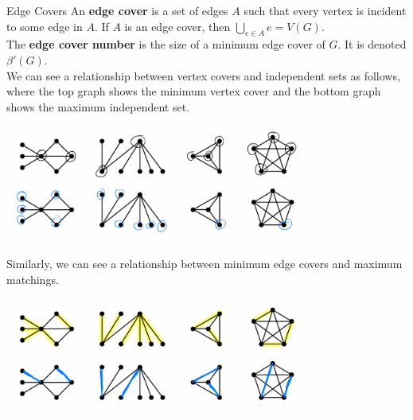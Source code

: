 \documentclass[10pt]{extarticle}
\begin{document}
  \begin{problem}{Edge Covers}
    An \textbf{edge cover} is a set of edges $A$ such that every vertex is incident to some edge in $A$. If $A$ is an edge cover, then $\bigcup_{e\in A} e = V(G)$.\\

    The \textbf{edge cover number} is the size of a minimum edge cover of $G$. It is denoted $\beta'(G)$.\\

    We can see a relationship between vertex covers and independent sets as follows, where the top graph shows the minimum vertex cover and the bottom graph shows the maximum independent set.
    \begin{center}
      \includegraphics[width=10cm]{vertex-cover-independent-set}
    \end{center}
    Similarly, we can see a relationship between minimum edge covers and maximum matchings.
    \begin{center}
      \includegraphics[width=10cm]{edge-cover-maximum-matching}
    \end{center}
  \end{problem}
\end{document}
